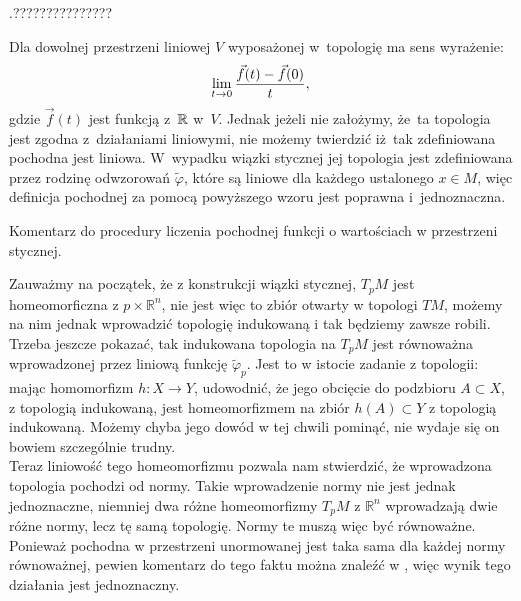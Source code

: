 \documentclass[a4paper,11pt]{article}
\begin{document}
\start {} .???????????????

\start {} Dla dowolnej przestrzeni liniowej $V$ wyposażonej
w~topologię ma sens wyrażenie:
\begin{equation*}
  \lim\limits_{ t \to 0 } \frac{ \vec{ f }( t ) - \vec{ f }( 0 ) }{ t },
\end{equation*}
gdzie $\vec{ f }( t )$ jest funkcją z~$\mathbb{R}$ w~$V$. Jednak jeżeli
nie założymy, że~ta topologia jest zgodna z~działaniami liniowymi, nie
możemy twierdzić iż~tak zdefiniowana pochodna jest liniowa. W~wypadku
wiązki stycznej jej topologia jest zdefiniowana przez rodzinę
odwzorowań $\widetilde{\varphi}$, które są liniowe dla każdego
ustalonego $x \in M$, więc definicja pochodnej za pomocą powyższego
wzoru jest poprawna i~jednoznaczna.

\start Komentarz do procedury liczenia pochodnej funkcji o wartościach
w przestrzeni stycznej.

Zauważmy na początek, że z konstrukcji wiązki stycznej, $T_{ p }M$
jest homeomorficzna z $p \times \mathbb{R}^{ n }$, nie jest więc to
zbiór otwarty w topologi $TM$, możemy na nim jednak wprowadzić
topologię indukowaną i tak będziemy zawsze robili. Trzeba jeszcze
pokazać, tak indukowana topologia na $T_{ p }M$ jest równoważna
wprowadzonej przez liniową funkcję $\widetilde{\varphi}_{ p }$. Jest
to w istocie zadanie z topologii: mając homomorfizm
$h : X \rightarrow Y$, udowodnić,
że jego obcięcie do podzbioru $A \subset X$, z topologią indukowaną, jest homeomorfizmem na zbiór $h( A ) \subset Y$ z topologią indukowaną. Możemy chyba jego dowód w tej chwili pominąć, nie wydaje się on bowiem szczególnie trudny. \\
Teraz liniowość tego homeomorfizmu pozwala nam stwierdzić, że
wprowadzona topologia pochodzi od normy. Takie wprowadzenie normy nie
jest jednak jednoznaczne, niemniej dwa różne homeomorfizmy $T_{ p }M$
z $\mathbb{R}^{ n }$ wprowadzają dwie różne normy, lecz tę samą
topologię. Normy te muszą więc być równoważne. Ponieważ pochodna w
przestrzeni unormowanej jest taka sama dla każdej normy równoważnej,
pewien komentarz do tego faktu można znaleźć w \cite{Sch79}, więc
wynik tego działania jest jednoznaczny.
\end{document}
